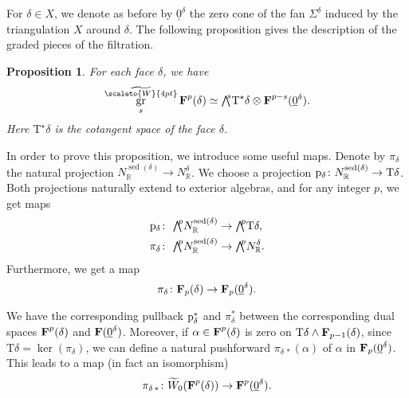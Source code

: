 \documentclass[11pt]{amsart}
\newtheorem{prop}[thm]{Proposition}
\theoremstyle{definition}
\numberwithin{equation}{section}
\renewcommand{\~}{\widetilde}
\newcommand{\R}{\mathbb{R}}
\let\oldbigwedge\bigwedge
\renewcommand{\bigwedge}{{\textstyle\oldbigwedge\!}}
\DeclareMathOperator{\sed}{sed} %
\DeclareMathOperator{\gr}{gr} %
\newcommand{\TT}{\mathrm{T}} %
\newcommand{\dual}{\star} %
\newcommand{\SF}{\textrm{\bf F}} %
\newcommand{\p}{{\rm p}} %
\newcommand{\conezero}{{\underline0}} %
\newcommand{\ws}{\scaleto{W}{4pt}}
\begin{document}
\medskip

For $\delta \in X$, we denote as before by $\conezero^\delta$ the zero cone of the fan $\Sigma^\delta$ induced by the triangulation $X$ around $\delta$. The following proposition gives the description of the graded pieces of the filtration.

\begin{prop}\label{prop:grading1}
For each face $\delta$, we have
\[ \gr_s^{\~ \ws}\SF^p(\delta) \simeq \bigwedge^s \TT^\dual\delta \otimes \SF^{p-s}(\conezero^\delta). \]
Here $\TT^\dual\delta$ is the cotangent space of the face $\delta$.
\end{prop}

In order to prove this proposition, we introduce some useful maps. Denote by $\pi_\delta$ the natural projection $N^{\sed(\delta)}_\R \to N^\delta_\R$. We choose a projection $\p_\delta\colon N^{\sed(\delta)}_\R \to \TT\delta$. Both projections naturally extend to exterior algebras, and for any integer $p$, we get maps
\begin{align*}
\p_\delta\colon\,\,& \bigwedge^p N^{\sed(\delta)}_\R \to \bigwedge^p \TT\delta, \\
\pi_\delta\colon\,\,& \bigwedge^p N^{\sed(\delta)}_\R \to \bigwedge^p N^\delta_\R.
\end{align*}
Furthermore, we get a map
\[ \pi_\delta\colon \SF_p(\delta) \to \SF_p(\conezero^\delta). \]

\medskip

We have the corresponding pullback $\p_\delta^*$ and $\pi_\delta^*$ between the corresponding dual spaces $\SF^p(\delta)$ and $\SF(\conezero^\delta)$. Moreover, if $\alpha\in\SF^p(\delta)$ is zero on $\TT\delta\wedge\SF_{p-1}(\delta)$, since $\TT\delta=\ker(\pi_\delta)$, we can define a natural pushforward $\pi_{\delta\,*}(\alpha)$ of $\alpha$ in $\SF_p(\conezero^\delta)$. This leads to a map (in fact an isomorphism)
\[ \pi_{\delta\,*}\colon \~W_0(\SF^p(\delta)) \to \SF^p(\conezero^\delta). \]
\end{document}
